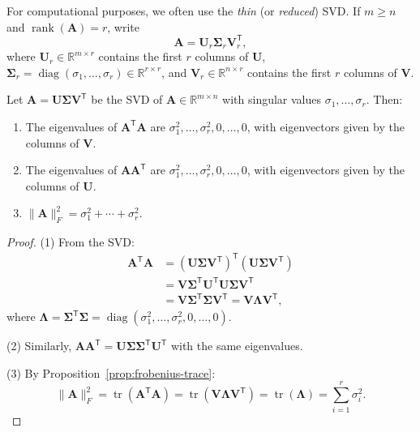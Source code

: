 \begin{remark}
  For computational purposes, we often use the \emph{thin} (or \emph{reduced}) SVD. If $m \geq n$ and $\operatorname{rank}(\mathbf{A}) = r$, write
  \[
    \mathbf{A} = \mathbf{U}_r \mathbf{\Sigma}_r \mathbf{V}_r^{\mathsf{T}},
  \]
  where $\mathbf{U}_r \in \mathbb{R}^{m \times r}$ contains the first $r$ columns of $\mathbf{U}$, $\mathbf{\Sigma}_r = \operatorname{diag}(\sigma_1,\dots,\sigma_r) \in \mathbb{R}^{r \times r}$, and $\mathbf{V}_r \in \mathbb{R}^{n \times r}$ contains the first $r$ columns of $\mathbf{V}$.
\end{remark}

\begin{proposition}
  Let $\mathbf{A} = \mathbf{U}\mathbf{\Sigma}\mathbf{V}^{\mathsf{T}}$ be the SVD of $\mathbf{A} \in \mathbb{R}^{m \times n}$ with singular values $\sigma_1,\dots,\sigma_r$. Then:
  \begin{enumerate}
    \item The eigenvalues of $\mathbf{A}^{\mathsf{T}}\mathbf{A}$ are $\sigma_1^2,\dots,\sigma_r^2, 0,\dots,0$, with eigenvectors given by the columns of $\mathbf{V}$.
    \item The eigenvalues of $\mathbf{A}\mathbf{A}^{\mathsf{T}}$ are $\sigma_1^2,\dots,\sigma_r^2, 0,\dots,0$, with eigenvectors given by the columns of $\mathbf{U}$.
    \item $\|\mathbf{A}\|_F^2 = \sigma_1^2 + \cdots + \sigma_r^2$.
  \end{enumerate}
\end{proposition}

\begin{proof}
  (1) From the SVD:
  \begin{align*}
    \mathbf{A}^{\mathsf{T}}\mathbf{A}
     & = (\mathbf{U}\mathbf{\Sigma}\mathbf{V}^{\mathsf{T}})^{\mathsf{T}}(\mathbf{U}\mathbf{\Sigma}\mathbf{V}^{\mathsf{T}})                   \\
     & = \mathbf{V}\mathbf{\Sigma}^{\mathsf{T}}\mathbf{U}^{\mathsf{T}}\mathbf{U}\mathbf{\Sigma}\mathbf{V}^{\mathsf{T}}                       \\
     & = \mathbf{V}\mathbf{\Sigma}^{\mathsf{T}}\mathbf{\Sigma}\mathbf{V}^{\mathsf{T}} = \mathbf{V} \mathbf{\Lambda} \mathbf{V}^{\mathsf{T}},
  \end{align*}
  where $\mathbf{\Lambda} = \mathbf{\Sigma}^{\mathsf{T}}\mathbf{\Sigma} = \operatorname{diag}(\sigma_1^2,\dots,\sigma_r^2, 0,\dots,0)$.

  (2) Similarly, $\mathbf{A}\mathbf{A}^{\mathsf{T}} = \mathbf{U}\mathbf{\Sigma}\mathbf{\Sigma}^{\mathsf{T}}\mathbf{U}^{\mathsf{T}}$ with the same eigenvalues.

  (3) By Proposition~\ref{prop:frobenius-trace}:
  \[
    \|\mathbf{A}\|_F^2 = \operatorname{tr}(\mathbf{A}^{\mathsf{T}}\mathbf{A}) = \operatorname{tr}(\mathbf{V}\mathbf{\Lambda}\mathbf{V}^{\mathsf{T}}) = \operatorname{tr}(\mathbf{\Lambda}) = \sum_{i=1}^{r} \sigma_i^2.
  \]
\end{proof}

